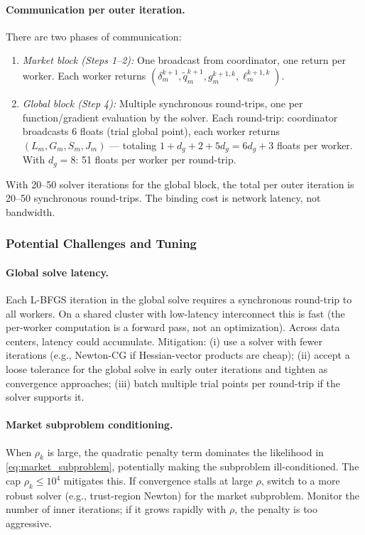\documentclass[11pt]{article}
\begin{document}
\paragraph{Communication per outer iteration.} There are two phases of communication:
\begin{enumerate}[label=(\alph*)]
\item \emph{Market block (Steps 1--2):} One broadcast from coordinator, one return per worker. Each worker returns $(\delta_m^{k+1}, \tilde q_m^{k+1}, g_m^{k+1,k}, \ell_m^{k+1,k})$.
\item \emph{Global block (Step 4):} Multiple synchronous round-trips, one per function/gradient evaluation by the solver. Each round-trip: coordinator broadcasts 6 floats (trial global point), each worker returns $(L_m, G_m, S_m, J_m)$ --- totaling $1 + d_g + 2 + 5d_g = 6d_g+3$ floats per worker. With $d_g=8$: 51 floats per worker per round-trip.
\end{enumerate}
With 20--50 solver iterations for the global block, the total per outer iteration is 20--50 synchronous round-trips. The binding cost is network latency, not bandwidth.

\subsubsection{Potential Challenges and Tuning}\label{sec:challenges}

\paragraph{Global solve latency.} Each L-BFGS iteration in the global solve requires a synchronous round-trip to all workers. On a shared cluster with low-latency interconnect this is fast (the per-worker computation is a forward pass, not an optimization). Across data centers, latency could accumulate. Mitigation: (i) use a solver with fewer iterations (e.g., Newton-CG if Hessian-vector products are cheap); (ii) accept a loose tolerance for the global solve in early outer iterations and tighten as convergence approaches; (iii) batch multiple trial points per round-trip if the solver supports it.

\paragraph{Market subproblem conditioning.} When $\rho_k$ is large, the quadratic penalty term dominates the likelihood in \eqref{eq:market_subproblem}, potentially making the subproblem ill-conditioned. The cap $\rho_k \leq 10^4$ mitigates this. If convergence stalls at large $\rho$, switch to a more robust solver (e.g., trust-region Newton) for the market subproblem. Monitor the number of inner iterations; if it grows rapidly with $\rho$, the penalty is too aggressive.
\end{document}
